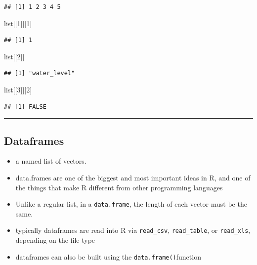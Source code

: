 \documentclass[
]{article}
\newenvironment{Shaded}{\begin{snugshade}}{\end{snugshade}}
\newcommand{\DecValTok}[1]{\textcolor[rgb]{0.00,0.00,0.81}{#1}}
\newcommand{\NormalTok}[1]{#1}
\begin{document}
\begin{verbatim}
## [1] 1 2 3 4 5
\end{verbatim}

\begin{Shaded}
\begin{Highlighting}[]
\NormalTok{list[[}\DecValTok{1}\NormalTok{]][}\DecValTok{1}\NormalTok{]}
\end{Highlighting}
\end{Shaded}

\begin{verbatim}
## [1] 1
\end{verbatim}

\begin{Shaded}
\begin{Highlighting}[]
\NormalTok{list[[}\DecValTok{2}\NormalTok{]]}
\end{Highlighting}
\end{Shaded}

\begin{verbatim}
## [1] "water_level"
\end{verbatim}

\begin{Shaded}
\begin{Highlighting}[]
\NormalTok{list[[}\DecValTok{3}\NormalTok{]][}\DecValTok{2}\NormalTok{]}
\end{Highlighting}
\end{Shaded}

\begin{verbatim}
## [1] FALSE
\end{verbatim}

\begin{center}\rule{0.5\linewidth}{0.5pt}\end{center}

\hypertarget{dataframes}{%
\subsection{\texorpdfstring{\textbf{Dataframes}}{Dataframes}}\label{dataframes}}

\begin{itemize}
\item
  a named list of vectors.
\item
  data.frames are one of the biggest and most important ideas in R, and
  one of the things that make R different from other programming
  languages
\item
  Unlike a regular list, in a \texttt{data.frame}, the length of each
  vector must be the same.
\item
  typically dataframes are read into R via \texttt{read\_csv},
  \texttt{read\_table}, or \texttt{read\_xls}, depending on the file
  type
\item
  dataframes can also be built using the \texttt{data.frame()}function
\end{itemize}
\end{document}
